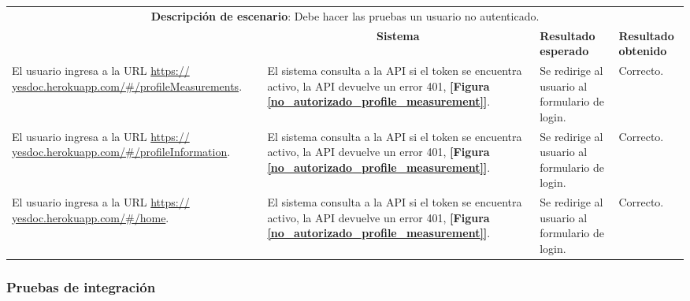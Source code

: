   \begin{center}
  	\begin{longtable}{|m{4cm}|m{4cm}|m{3cm}|m{2cm}|}
  		\hline \rowcolor[gray]{0.9}
  		\multicolumn{4}{|c|}{\textbf{Procedimiento de pruebas}} \\
  		\hline 
  		
  		\multicolumn{4}{|c|}{\textbf{Descripción de escenario}: Debe hacer las pruebas un usuario no autenticado.} \\
  		\hline 
  		
  		\rowcolor[gray]{0.9}
  		\multicolumn{1}{|c|}{\textbf{Actor}} &
  		\multicolumn{1}{c|}{\textbf{Sistema}} &
  		\textbf{Resultado esperado}&
  		\textbf{Resultado obtenido} \\
  		\hline
  		\endhead
  		El usuario ingresa a la URL \url{https:// yesdoc.herokuapp.com/#/profileMeasurements}.
  		&
  		El sistema consulta a la API si el token se encuentra activo, la API devuelve un error 401, \textbf{[Figura \ref{no_autorizado_profile_measurement}]}.
  		&
  		Se redirige al usuario al formulario de login.
  		&
  		Correcto.
  		\\ 
  		\hline
  		El usuario ingresa a la URL \url{https:// yesdoc.herokuapp.com/#/profileInformation}.
  		&
  		El sistema consulta a la API si el token se encuentra activo, la API devuelve un error 401, \textbf{[Figura \ref{no_autorizado_profile_measurement}]}.
  		&
  		Se redirige al usuario al formulario de login.
  		&
  		Correcto.
  		\\ 
  		\hline
  		El usuario ingresa a la URL \url{https:// yesdoc.herokuapp.com/#/home}.
  		&
  		El sistema consulta a la API si el token se encuentra activo, la API devuelve un error 401, \textbf{[Figura \ref{no_autorizado_profile_measurement}]}.
  		&
  		Se redirige al usuario al formulario de login.
  		&
  		Correcto.
  		\\ 
  		\hline
  		
  	\end{longtable}
  \end{center}
  
  \subsubsection{Pruebas de integración}
  
